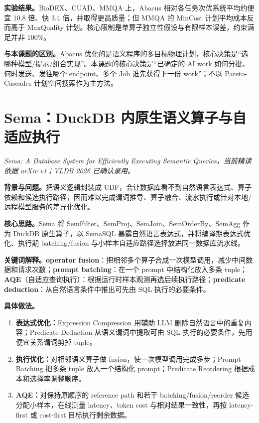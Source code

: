 \documentclass[10pt,a4paper]{ctexart}
\let\digestoriginalsection\section
\renewcommand{\section}{\Needspace{7\baselineskip}\digestoriginalsection}
\newcommand{\paperinfo}[1]{\textit{#1}\par}
\newcommand{\field}[1]{\par\noindent\textbf{#1。}\hspace{0.25em}}
\begin{document}
\field{实验结果}BioDEX、CUAD、MMQA 上，Abacus 相对各任务次优系统平均约便宜 10.8 倍、快 3.4 倍，并取得更高质量；但 MMQA 的 MinCost 计划平均成本反而高于 MaxQuality 计划。核心限制是单算子独立性假设与有限样本误差，约束满足并非 100\%。

\field{与本课题的区别}Abacus 优化的是语义程序的多目标物理计划，核心决策是“选哪种模型/提示/组合实现”。本课题的核心决策是“已确定的 AI work 如何分批、何时发送、发往哪个 endpoint、多个 Job 谁先获得下一份 work”；不以 Pareto-Cascades 计划空间搜索作为主方法。

\section{Sema：DuckDB 内原生语义算子与自适应执行}
\paperinfo{Sema: A Database System for Efficiently Executing Semantic Queries，当前精读依据 arXiv v1；VLDB 2026 已确认录用。}

\field{背景与问题}把语义逻辑封装成 UDF，会让数据库看不到自然语言表达式、算子依赖和候选执行路径，因而难以完成谓词推导、算子融合、流水执行或针对本地/远程模型服务的差异化优化。

\field{核心思路}Sema 将 SemFilter、SemProj、SemJoin、SemOrderBy、SemAgg 作为 DuckDB 原生算子，以 SemaSQL 暴露自然语言表达式，并将编译期表达式优化、执行期 batching/fusion 与小样本自适应路径选择放进同一数据库流水线。

\field{关键词解释}\textbf{operator fusion}：把相邻多个算子合成一次模型调用，减少中间数据和请求次数；\textbf{prompt batching}：在一个 prompt 中结构化放入多条 tuple；\textbf{AQE}（自适应查询执行）：根据运行时样本观测再选后续执行路径；\textbf{predicate deduction}：从自然语言条件中推出可先由 SQL 执行的必要条件。

\field{具体做法}
\begin{enumerate}
  \item \textbf{表达式优化：}Expression Compression 用辅助 LLM 删除自然语言中的重复内容；Predicate Deduction 从语义谓词中提取可由 SQL 执行的必要条件，先用便宜关系谓词剪掉 tuple。
  \item \textbf{执行优化：}对相邻语义算子做 fusion，使一次模型调用完成多步；Prompt Batching 把多条 tuple 放入一个结构化 prompt；Predicate Reordering 根据成本和选择率调整顺序。
  \item \textbf{AQE：}对保持原顺序的 reference path 和若干 batching/fusion/reorder 候选分配小样本，在线测量 latency、token cost 与相对结果一致性，再按 latency-first 或 cost-first 目标执行剩余数据。
\end{enumerate}
\end{document}
